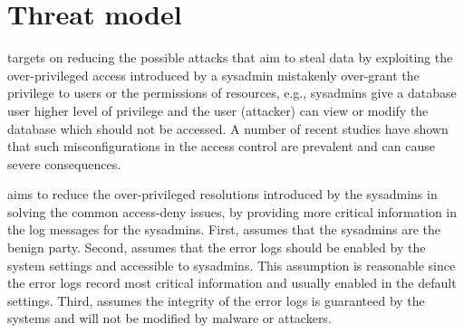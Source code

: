 \section{Threat model}
\label{sec:threat}

\ace targets on reducing the possible attacks that aim to steal data by
exploiting the over-privileged access introduced by a sysadmin mistakenly 
over-grant the privilege to users or the permissions of resources, e.g., 
sysadmins give a database user higher level of privilege and the user 
(attacker) can view or modify the database which should not be accessed.
A number of recent studies 
\cite{bauer2009real,bauer2011detecting,Schneier2009,sinclair2010s,xu2017system}
have shown that such misconfigurations in the access control are prevalent and 
can cause severe consequences.


\ace aims to reduce the over-privileged resolutions introduced by the 
sysadmins in solving the common access-deny issues, by providing more 
critical information in the log messages for the sysadmins. First, \ace assumes 
that the sysadmins are the benign party. Second, \ace assumes that the error 
logs should be enabled by the system settings and accessible to sysadmins. This 
assumption is reasonable since the error logs record most critical information 
and usually enabled in the default settings. Third, \ace assumes the integrity 
of the error logs is guaranteed by the systems and will not be modified by 
malware or attackers.